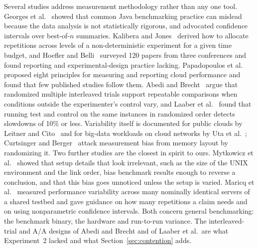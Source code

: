 \documentclass[conference]{IEEEtran}
\begin{document}
Several studies address measurement methodology rather than any one tool. Georges et
al.~\cite{georges2007} showed that common Java benchmarking practice can mislead because
the data analysis is not statistically rigorous, and advocated confidence intervals over
best-of-$n$ summaries. Kalibera and Jones~\cite{kalibera2013} derived how to allocate
repetitions across levels of a non-deterministic experiment for a given time budget, and
Hoefler and Belli~\cite{hoefler2015} surveyed 120 papers from three conferences and found
reporting and experimental-design practice lacking. Papadopoulos et
al.~\cite{papadopoulos2021} proposed eight principles for measuring and reporting cloud
performance and found that few published studies follow them. Abedi and
Brecht~\cite{abedi2017} argue that randomized multiple interleaved trials support
repeatable comparisons when conditions outside the experimenter's control vary, and
Laaber et al.~\cite{laaber2019} found that running test and control on the same instances
in randomized order detects slowdowns of 10\% or less. Variability itself is documented
for public clouds by Leitner and Cito~\cite{leitner2016} and for big-data workloads on
cloud networks by Uta et al.~\cite{uta2020}; Curtsinger and Berger~\cite{curtsinger2013}
attack measurement bias from memory layout by randomizing it. Two further studies are
the closest in spirit to ours. Mytkowicz et
al.~\cite{mytkowicz2009} showed that setup details that look irrelevant, such as the size
of the UNIX environment and the link order, bias benchmark results enough to reverse a
conclusion, and that this bias goes unnoticed unless the setup is varied. Maricq et
al.~\cite{maricq2018} measured performance variability across many nominally identical
servers of a shared testbed and gave guidance on how many repetitions a claim needs and
on using nonparametric confidence intervals. Both concern general benchmarking: the
benchmark binary, the hardware and run-to-run variance. The interleaved-trial and
A/A designs of Abedi and Brecht and of Laaber et al.\ are what Experiment~2 lacked and
what Section~\ref{sec:contention} adds.
\end{document}
